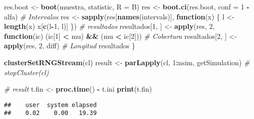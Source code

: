 \documentclass[]{book}
\newenvironment{Shaded}{\begin{snugshade}}{\end{snugshade}}
\newcommand{\KeywordTok}[1]{\textcolor[rgb]{0.13,0.29,0.53}{\textbf{#1}}}
\newcommand{\DataTypeTok}[1]{\textcolor[rgb]{0.13,0.29,0.53}{#1}}
\newcommand{\DecValTok}[1]{\textcolor[rgb]{0.00,0.00,0.81}{#1}}
\newcommand{\StringTok}[1]{\textcolor[rgb]{0.31,0.60,0.02}{#1}}
\newcommand{\CommentTok}[1]{\textcolor[rgb]{0.56,0.35,0.01}{\textit{#1}}}
\newcommand{\ControlFlowTok}[1]{\textcolor[rgb]{0.13,0.29,0.53}{\textbf{#1}}}
\newcommand{\OperatorTok}[1]{\textcolor[rgb]{0.81,0.36,0.00}{\textbf{#1}}}
\newcommand{\NormalTok}[1]{#1}
\theoremstyle{break}
\theoremstyle{definition}
\theoremstyle{definition}
\theoremstyle{definition}
\theoremstyle{remark}
\begin{document}
\begin{Shaded}
\begin{Highlighting}[]
\NormalTok{    res.boot <-}\StringTok{ }\KeywordTok{boot}\NormalTok{(muestra, statistic, }\DataTypeTok{R =}\NormalTok{ B)}
\NormalTok{    res <-}\StringTok{ }\KeywordTok{boot.ci}\NormalTok{(res.boot, }\DataTypeTok{conf =} \DecValTok{1} \OperatorTok{-}\StringTok{ }\NormalTok{alfa)}
    \CommentTok{# Intervalos}
\NormalTok{    res <-}\StringTok{ }\KeywordTok{sapply}\NormalTok{(res[}\KeywordTok{names}\NormalTok{(intervals)], }\ControlFlowTok{function}\NormalTok{(x) \{}
\NormalTok{      l <-}\StringTok{ }\KeywordTok{length}\NormalTok{(x)}
\NormalTok{      x[}\KeywordTok{c}\NormalTok{(l}\OperatorTok{-}\DecValTok{1}\NormalTok{, l)]}
\NormalTok{    \})}
    \CommentTok{# resultados}
\NormalTok{    resultados[}\DecValTok{1}\NormalTok{, ] <-}\StringTok{ }\KeywordTok{apply}\NormalTok{(res, }\DecValTok{2}\NormalTok{,}
                                   \ControlFlowTok{function}\NormalTok{(ic) (ic[}\DecValTok{1}\NormalTok{] }\OperatorTok{<}\StringTok{ }\NormalTok{mu) }\OperatorTok{&&}\StringTok{ }\NormalTok{(mu }\OperatorTok{<}\StringTok{ }\NormalTok{ic[}\DecValTok{2}\NormalTok{])) }\CommentTok{# Cobertura}
\NormalTok{    resultados[}\DecValTok{2}\NormalTok{, ] <-}\StringTok{ }\KeywordTok{apply}\NormalTok{(res, }\DecValTok{2}\NormalTok{, diff) }\CommentTok{# Longitud}
\NormalTok{    resultados}
\NormalTok{\}}

\KeywordTok{clusterSetRNGStream}\NormalTok{(cl)}
\NormalTok{result <-}\StringTok{ }\KeywordTok{parLapply}\NormalTok{(cl, }\DecValTok{1}\OperatorTok{:}\NormalTok{nsim, getSimulation)}
\CommentTok{# stopCluster(cl)}

\CommentTok{# result}
\NormalTok{t.fin <-}\StringTok{ }\KeywordTok{proc.time}\NormalTok{() }\OperatorTok{-}\StringTok{ }\NormalTok{t.ini}
\KeywordTok{print}\NormalTok{(t.fin)}
\end{Highlighting}
\end{Shaded}

\begin{verbatim}
##    user  system elapsed 
##    0.02    0.00   19.39
\end{verbatim}
\end{document}

